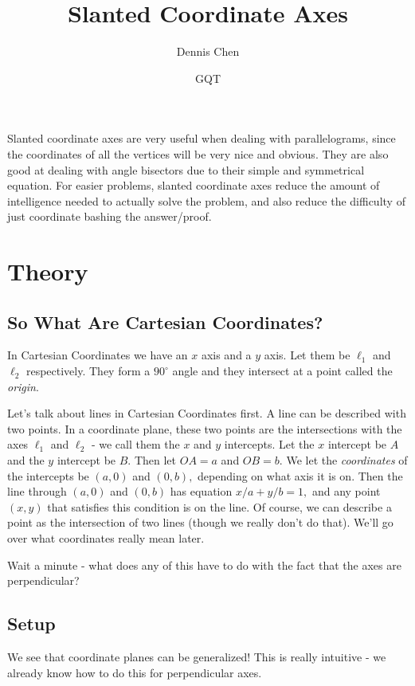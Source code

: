 \documentclass[mast]{lucky}
\title{Slanted Coordinate Axes}
\author{Dennis Chen}
\date{GQT}
\begin{document}
\maketitle

Slanted coordinate axes are very useful when dealing with parallelograms, since the coordinates of all the vertices will be very nice and obvious. They are also good at dealing with angle bisectors due to their simple and symmetrical equation. For easier problems, slanted coordinate axes reduce the amount of intelligence needed to actually solve the problem, and also reduce the difficulty of just coordinate bashing the answer/proof.

\section{Theory}

\subsection{So What Are Cartesian Coordinates?}
In Cartesian Coordinates we have an $x$ axis and a $y$ axis. Let them be $\ell_1$ and $\ell_2$ respectively. They form a $90^{\circ}$ angle and they intersect at a point called the \textit{origin}.

Let's talk about lines in Cartesian Coordinates first. A line can be described with two points. In a coordinate plane, these two points are the intersections with the axes $\ell_1$ and $\ell_2$ - we call them the $x$ and $y$ intercepts. Let the $x$ intercept be $A$ and the $y$ intercept be $B.$ Then let $OA=a$ and $OB=b.$ We let the \textit{coordinates} of the intercepts be $(a,0)$ and $(0,b),$ depending on what axis it is on. Then the line through $(a,0)$ and $(0,b)$ has equation $x/a+y/b=1,$ and any point $(x,y)$ that satisfies this condition is on the line. Of course, we can describe a point as the intersection of two lines (though we really don't do that). We'll go over what coordinates really mean later.

Wait a minute - what does any of this have to do with the fact that the axes are perpendicular?

\subsection{Setup}
We see that coordinate planes can be generalized! This is really intuitive - we already know how to do this for perpendicular axes.
\end{document}
